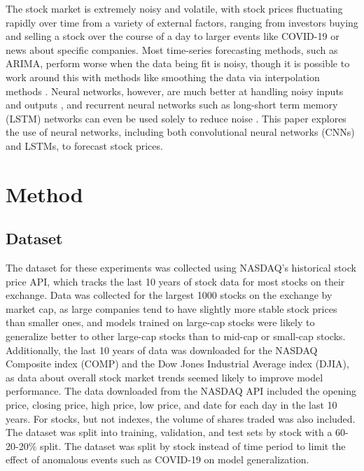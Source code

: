 \documentclass[conference]{IEEEtran}
\begin{document}
The stock market is extremely noisy and volatile, with stock prices fluctuating rapidly over time from a variety of external factors, ranging from investors buying and selling a stock over the course of a day to larger events like COVID-19 \cite{Ruan_2020} or news about specific companies. Most time-series forecasting methods, such as ARIMA, perform worse when the data being fit is noisy, though it is possible to work around this with methods like smoothing the data via interpolation methods \cite{yu2023application}. Neural networks, however, are much better at handling noisy inputs and outputs \cite{rolnick2018deep}, and recurrent neural networks such as long-short term memory (LSTM) networks can even be used solely to reduce noise \cite{9483103}. This paper explores the use of neural networks, including both convolutional neural networks (CNNs) and LSTMs, to forecast stock prices.

\section{Method}
\subsection{Dataset}
The dataset for these experiments was collected using NASDAQ's historical stock price API, which tracks the last 10 years of stock data for most stocks on their exchange. Data was collected for the largest 1000 stocks on the exchange by market cap, as large companies tend to have slightly more stable stock prices than smaller ones, and models trained on large-cap stocks were likely to generalize better to other large-cap stocks than to mid-cap or small-cap stocks. Additionally, the last 10 years of data was downloaded for the NASDAQ Composite index (COMP) and the Dow Jones Industrial Average index (DJIA), as data about overall stock market trends seemed likely to improve model performance. The data downloaded from the NASDAQ API included the opening price, closing price, high price, low price, and date for each day in the last 10 years. For stocks, but not indexes, the volume of shares traded was also included. The dataset was split into training, validation, and test sets by stock with a 60-20-20\% split. The dataset was split by stock instead of time period to limit the effect of anomalous events such as COVID-19 on model generalization.
\end{document}
